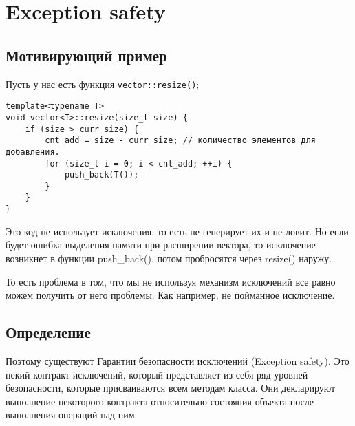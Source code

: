 \section{Exception safety}
\subsection{Мотивирующий пример}
Пусть у нас есть функция \texttt{vector::resize()};

\begin{verbatim}
template<typename T>
void vector<T>::resize(size_t size) {
    if (size > curr_size) {
        cnt_add = size - curr_size; // количество элементов для добавления.
        for (size_t i = 0; i < cnt_add; ++i) {
            push_back(T());
        }
    }
}
\end{verbatim}


Это код не использует исключения, то есть не генерирует их и не ловит. Но если будет ошибка выделения памяти при расширении вектора, то исключение возникнет в функции push\_back(), потом пробросятся через resize() наружу.

То есть проблема в том, что мы не используя механизм исключений все равно можем получить от него проблемы. Как например, не пойманное исключение.

\subsection{Определение}

Поэтому существуют Гарантии безопасности исключений (Exception safety). Это некий контракт исключений, который представляет из себя ряд уровней безопасности, которые присваиваются всем методам класса. Они декларируют выполнение некоторого контракта относительно состояния объекта после выполнения операций над ним.

